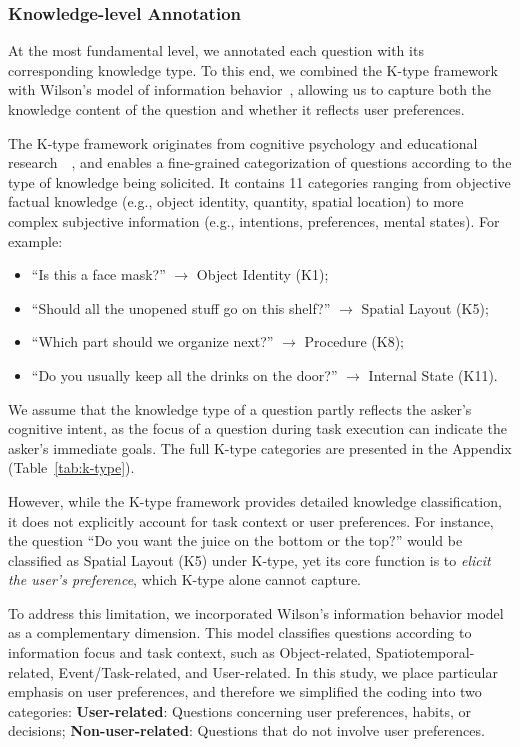 \documentclass[sigconf,authordraft]{acmart}
\begin{document}
\subsubsection{Knowledge-level Annotation}
At the most fundamental level, we annotated each question with its corresponding knowledge type. To this end, we combined the K-type framework~\cite{shin2023uncertainty} with Wilson’s model of information behavior~\cite{wilson1999models}, allowing us to capture both the knowledge content of the question and whether it reflects user preferences. 

The K-type framework originates from cognitive psychology and educational research~\cite{redfield1981meta}~\cite{tofade2013best}, and enables a fine-grained categorization of questions according to the type of knowledge being solicited. It contains 11 categories ranging from objective factual knowledge (e.g., object identity, quantity, spatial location) to more complex subjective information (e.g., intentions, preferences, mental states). For example:
\begin{itemize}
    \item ``Is this a face mask?'' $\rightarrow$ Object Identity (K1);
    \item ``Should all the unopened stuff go on this shelf?'' $\rightarrow$ Spatial Layout (K5);
    \item ``Which part should we organize next?'' $\rightarrow$ Procedure (K8);
    \item ``Do you usually keep all the drinks on the door?'' $\rightarrow$ Internal State (K11).
\end{itemize}

We assume that the knowledge type of a question partly reflects the asker’s cognitive intent, as the focus of a question during task execution can indicate the asker’s immediate goals. The full K-type categories are presented in the Appendix (Table~\ref{tab:k-type}). 

However, while the K-type framework provides detailed knowledge classification, it does not explicitly account for task context or user preferences. For instance, the question ``Do you want the juice on the bottom or the top?'' would be classified as Spatial Layout (K5) under K-type, yet its core function is to \textit{elicit the user’s preference}, which K-type alone cannot capture. 

To address this limitation, we incorporated Wilson’s information behavior model as a complementary dimension. This model classifies questions according to information focus and task context, such as Object-related, Spatiotemporal-related, Event/Task-related, and User-related. In this study, we place particular emphasis on user preferences, and therefore we simplified the coding into two categories: \textbf{User-related}: Questions concerning user preferences, habits, or decisions; \textbf{Non-user-related}: Questions that do not involve user preferences.
\end{document}
